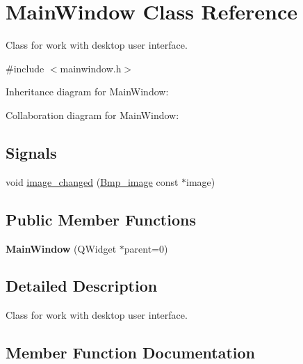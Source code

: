 \hypertarget{classMainWindow}{}\section{Main\+Window Class Reference}
\label{classMainWindow}


Class for work with desktop user interface.  




{\ttfamily \#include $<$mainwindow.\+h$>$}



Inheritance diagram for Main\+Window\+:


Collaboration diagram for Main\+Window\+:
\subsection*{Signals}
\begin{DoxyCompactItemize}
\item 
void \hyperlink{classMainWindow_a2b2bf5c2345d770bb4198a89792af1c3}{image\+\_\+changed} (\hyperlink{classBmp__image}{Bmp\+\_\+image} const $\ast$image)
\end{DoxyCompactItemize}
\subsection*{Public Member Functions}
\begin{DoxyCompactItemize}
\item 
{\bfseries Main\+Window} (Q\+Widget $\ast$parent=0)\hypertarget{classMainWindow_a8b244be8b7b7db1b08de2a2acb9409db}{}\label{classMainWindow_a8b244be8b7b7db1b08de2a2acb9409db}

\end{DoxyCompactItemize}


\subsection{Detailed Description}
Class for work with desktop user interface. 

\subsection{Member Function Documentation}
